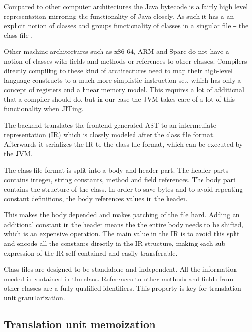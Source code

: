 \documentclass{VUMIFPSbakalaurinis}
\begin{document}
Compared to other computer architectures the Java bytecode is a fairly high level representation mirroring the functionality of Java closely.
As such it has a an explicit notion of classes and groups functionality of classes in a singular file ‒ the class file \cite{ClassFileFormat}.

Other machine architectures such as x86-64, ARM and Sparc do not have a notion of classes with fields and methods or references to other classes.
Compilers directly compiling to these kind of architectures need to map their high-level language constructs to a much more simplistic instruction set, which has only a concept of registers and a linear memory model.
This requires a lot of additional that a compiler should do, but in our case the JVM takes care of a lot of this functionality when JITing.

The backend translates the frontend generated AST to an intermediate representation (IR) which is closely modeled after the class file format.
Afterwards it serializes the IR to the class file format, which can be executed by the JVM.

The class file format is split into a body and header part.
The header parts contains integer, string constants, method and field references.
The body part contains the structure of the class.
In order to save bytes and to avoid repeating constant definitions, the body references values in the header.

This makes the body depended and makes patching of the file hard.
Adding an additional constant in the header means the the entire body needs to be shifted, which is an expensive operation.
The main value in the IR is to avoid this split and encode all the constants directly in the IR structure, making each sub expression of the IR self contained and easily transferable.

Class files are designed to be standalone and independent.
All the information needed is contained in the class.
References to other methods and fields from other classes are a fully qualified identifiers.
This property is key for translation unit granularization.

\subsection{Translation unit memoization}
\end{document}
